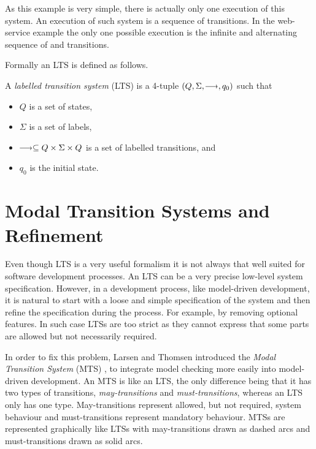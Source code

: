 As this example is very simple, there is actually only one execution of this system. An execution of such system is a sequence of transitions. In the web-service example the only one possible execution is the infinite and alternating sequence of  and  transitions.

Formally an LTS is defined as follows.

\begin{definition}
    A \emph{labelled transition system} (LTS) is a 4-tuple $(Q,\Sigma,\must{},q_0)$ such that
    \begin{itemize}
        \item $Q$ is a set of states,
        \item $\Sigma$ is a set of labels,
        \item $\must{} \subseteq Q \times \Sigma \times Q$ is a set of labelled transitions, and
        \item $q_0$ is the initial state.
    \end{itemize}
\end{definition}        

\section{Modal Transition Systems and Refinement}
Even though LTS is a very useful formalism it is not always that well suited for software development processes. An LTS can be a very precise low-level system specification. However, in a development process, like model-driven development, it is natural to start with a loose and simple specification of the system and then refine the specification during the process. For example, by removing optional features. In such case LTSs are too strict as they cannot express that some parts are allowed but not necessarily required. 

In order to fix this problem, Larsen and Thomsen introduced the \emph{Modal Transition System} (MTS) \cite{DBLP:conf/lics/LarsenT88},  to integrate model checking more easily into model-driven development. An MTS is like an LTS, the only difference being that it has two types of transitions, \emph{may-transitions} and \emph{must-transitions}, whereas an LTS only has one type. May-transitions represent allowed, but not required, system behaviour and must-transitions represent mandatory behaviour. MTSs are represented graphically like LTSs with may-transitions drawn as dashed arcs and must-transitions drawn as solid arcs.

